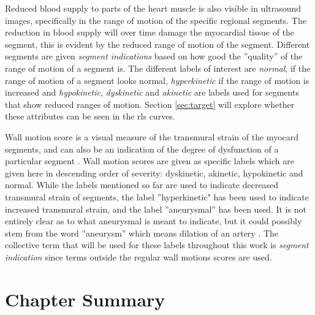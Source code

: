 Reduced blood supply to parts of the heart muscle is also visible in ultrasound images, specifically in the range of motion of the specific regional segments. The reduction in blood supply will over time damage the myocardial tissue of the segment, this is evident by the reduced range of motion of the segment. Different segments are given \textit{segment indications} based on how good the ''quality'' of the range of motion of a segment is. The different labels of interest are \textit{normal}, if the range of motion of a segment looks normal, \textit{hyperkinetic} if the range of motion is increased and \textit{hypokinetic}, \textit{dyskinetic} and \textit{akinetic} are labels used for segments that show reduced ranges of motion. Section \ref{sec:target} will explore whether these attributes can be seen in the \acrshort{rls} curves.

Wall motion score is a visual measure of the transmural strain of the myocard segments, and can also be an indication of the degree of dysfunction of a particular segment \cite{strain_rate_imaging}. Wall motion scores are given as specific labels which are given here in descending order of severity: dyskinetic, akinetic, hypokinetic and normal. While the labels mentioned so far are used to indicate decreased transmural strain of segments, the label ''hyperkinetic" has been used to indicate increased transmural strain, and the label ''aneurysmal'' has been used. It is not entirely clear as to what aneurysmal is meant to indicate, but it could possibly stem from the word ''aneurysm'' which means dilation of an artery \cite{medic_net_aneurysm}. The collective term that will be used for these labels throughout this work is \textit{segment indication} since terms outside the regular wall motions scores are used.

\section{Chapter Summary}

